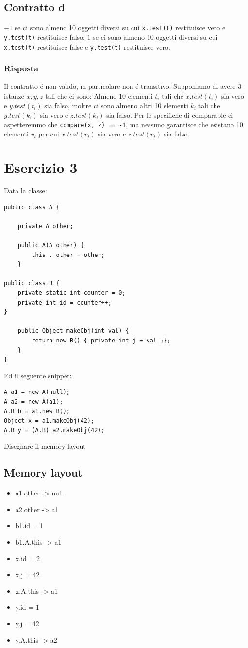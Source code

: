 \documentclass[11pt]{article}
\begin{document}
\subsection{Contratto d}
\label{sec:org991dbb1}
\(-1\) se ci sono almeno 10 oggetti diversi su cui \texttt{x.test(t)} restituisce vero e \texttt{y.test(t)} restituisce falso.
\(1\) se ci sono almeno 10 oggetti diversi su cui \texttt{x.test(t)} restituisce false e \texttt{y.test(t)} restituisce vero.
\subsubsection{Risposta}
\label{sec:org4aca544}
Il contratto é non valido, in particolare non é transitivo.
Supponiamo di avere \(3\) istanze \(x, y, z\) tali che ci sono:
Almeno 10 elementi \(t_i\) tali che \(x.test(t_i)\) sia vero e \(y.test(t_i)\) sia falso, inoltre ci sono almeno altri 10 elementi \(k_i\) tali che \(y.test(k_i)\) sia vero e \(z.test(k_i)\) sia falso.
Per le specifiche di comparable ci aspetteremmo che \texttt{compare(x, z) == -1}, ma nessuno garantisce che esistano 10 elementi \(v_i\) per cui \(x.test(v_i)\) sia vero e \(z.test(v_i)\) sia falso.
\section{Esercizio 3}
\label{sec:org30642d0}
Data la classe:
\begin{verbatim}
public class A {

    private A other;

    public A(A other) {
        this . other = other;
    }

public class B {
    private static int counter = 0;
    private int id = counter++;
}

    public Object makeObj(int val) {
        return new B() { private int j = val ;};
    }
}
\end{verbatim}
Ed il seguente snippet:
\begin{verbatim}
A a1 = new A(null);
A a2 = new A(a1);
A.B b = a1.new B();
Object x = a1.makeObj(42);
A.B y = (A.B) a2.makeObj(42);
\end{verbatim}
Disegnare il memory layout
\subsection{Memory layout}
\label{sec:orgdbf6aad}
\begin{itemize}
\item a1.other -> null
\item a2.other -> a1
\item b1.id = 1
\item b1.A.this -> a1
\item x.id = 2
\item x.j = 42
\item x.A.this -> a1
\item y.id = 1
\item y.j = 42
\item y.A.this -> a2
\end{itemize}
\end{document}
